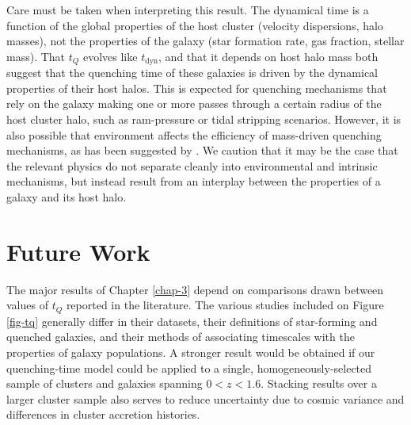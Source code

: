 Care must be taken when interpreting this result.
The dynamical time is a function of the global properties of the host cluster (velocity dispersions, halo masses), not the properties of the galaxy (star formation rate, gas fraction, stellar mass).
That $t_Q$ evolves like $t_\mathrm{dyn}$, and that it depends on host halo mass both suggest that the quenching time of these galaxies is driven by the dynamical properties of their host halos.
This is expected for quenching mechanisms that rely on the galaxy making one or more passes through a certain radius of the host cluster halo, such as ram-pressure or tidal stripping scenarios.
However, it is also possible that environment affects the efficiency of mass-driven quenching mechanisms, as has been suggested by \citet{Henriques:2017aa}.
We caution that it may be the case that the relevant physics do not separate cleanly into environmental and intrinsic mechanisms, but instead result from an interplay between the properties of a galaxy and its host halo.

\section{Future Work}


The major results of Chapter \ref{chap-3} depend on comparisons drawn between values of $t_Q$ reported in the literature.
The various studies included on Figure \ref{fig-tq} generally differ in their datasets, their definitions of star-forming and quenched galaxies, and their methods of associating timescales with the properties of galaxy populations.
A stronger result would be obtained if our quenching-time model could be applied to a single, homogeneously-selected sample of clusters and galaxies spanning $0 < z < 1.6$.
Stacking results over a larger cluster sample also serves to reduce uncertainty due to cosmic variance and differences in cluster accretion histories.

